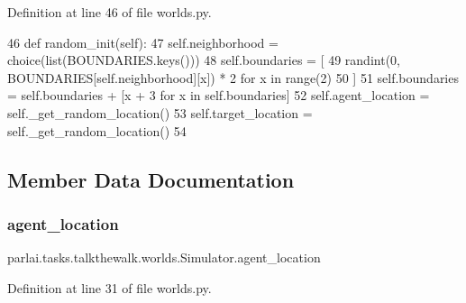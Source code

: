 Definition at line 46 of file worlds.\+py.


\begin{DoxyCode}
46     \textcolor{keyword}{def }random\_init(self):
47         self.neighborhood = choice(list(BOUNDARIES.keys()))
48         self.boundaries = [
49             randint(0, BOUNDARIES[self.neighborhood][x]) * 2 \textcolor{keywordflow}{for} x \textcolor{keywordflow}{in} range(2)
50         ]
51         self.boundaries = self.boundaries + [x + 3 \textcolor{keywordflow}{for} x \textcolor{keywordflow}{in} self.boundaries]
52         self.agent\_location = self.\_get\_random\_location()
53         self.target\_location = self.\_get\_random\_location()
54 
\end{DoxyCode}


\subsection{Member Data Documentation}
\mbox{\label{classparlai_1_1tasks_1_1talkthewalk_1_1worlds_1_1Simulator_a149433c72afebe5995a02d03133d4507}} 
\subsubsection{\texorpdfstring{agent\+\_\+location}{agent\_location}}
{\footnotesize\ttfamily parlai.\+tasks.\+talkthewalk.\+worlds.\+Simulator.\+agent\+\_\+location\hspace{0.3cm}{\ttfamily [static]}}



Definition at line 31 of file worlds.\+py.

\mbox{\label{classparlai_1_1tasks_1_1talkthewalk_1_1worlds_1_1Simulator_afb9280ec4243b403e5b8d7cf694dddd2}} 
